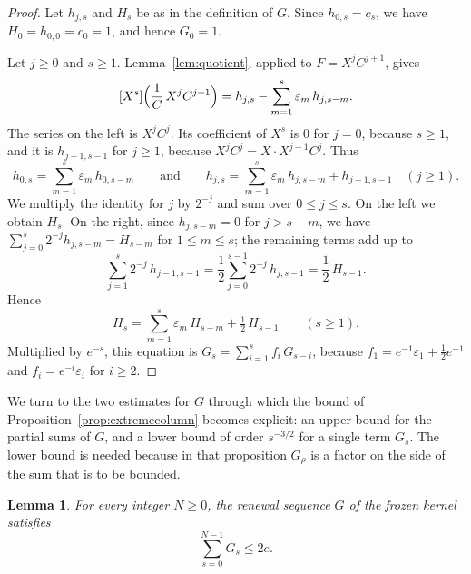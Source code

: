 \documentclass{amsart}
\newtheorem{lemma}[theorem]{Lemma}
\theoremstyle{definition}
\theoremstyle{remark}
\numberwithin{equation}{section}
\begin{document}
\begin{proof}
Let $h_{j,s}$ and $H_s$ be as in the definition of $G$. Since $h_{0,s}=c_s$, we have $H_0=h_{0,0}=c_0=1$, and hence $G_0=1$.

Let $j\ge 0$ and $s\ge 1$. Lemma~\ref{lem:quotient}, applied to $F=X^jC^{j+1}$, gives
\[
[X^s]\Bigl(\frac{1}{C}\,X^jC^{j+1}\Bigr)=h_{j,s}-\sum_{m=1}^{s}\varepsilon_m\,h_{j,s-m} .
\]
The series on the left is $X^jC^{j}$. Its coefficient of $X^s$ is $0$ for $j=0$, because $s\ge 1$, and it is $h_{j-1,s-1}$ for $j\ge 1$, because $X^jC^{j}=X\cdot X^{j-1}C^{j}$. Thus
\[
h_{0,s}=\sum_{m=1}^{s}\varepsilon_m\,h_{0,s-m}\qquad\text{and}\qquad h_{j,s}=\sum_{m=1}^{s}\varepsilon_m\,h_{j,s-m}+h_{j-1,s-1}\quad(j\ge 1).
\]
We multiply the identity for $j$ by $2^{-j}$ and sum over $0\le j\le s$. On the left we obtain $H_s$. On the right, since $h_{j,s-m}=0$ for $j>s-m$, we have $\sum_{j=0}^{s}2^{-j}h_{j,s-m}=H_{s-m}$ for $1\le m\le s$; the remaining terms add up to
\[
\sum_{j=1}^{s}2^{-j}\,h_{j-1,s-1}=\frac12\sum_{j=0}^{s-1}2^{-j}\,h_{j,s-1}=\frac12\,H_{s-1} .
\]
Hence
\[
H_s=\sum_{m=1}^{s}\varepsilon_m\,H_{s-m}+\tfrac12\,H_{s-1}\qquad(s\ge 1).
\]
Multiplied by $e^{-s}$, this equation is $G_s=\sum_{i=1}^{s}f_i\,G_{s-i}$, because $f_1=e^{-1}\varepsilon_1+\frac12e^{-1}$ and $f_i=e^{-i}\varepsilon_i$ for $i\ge 2$.
\end{proof}

We turn to the two estimates for $G$ through which the bound of Proposition~\ref{prop:extremecolumn} becomes explicit: an upper bound for the partial sums of $G$, and a lower bound of order $s^{-3/2}$ for a single term $G_s$. The lower bound is needed because in that proposition $G_\rho$ is a factor on the side of the sum that is to be bounded.

\begin{lemma}\label{lem:frozenmass}
For every integer $N\ge 0$, the renewal sequence $G$ of the frozen kernel satisfies
\[
\sum_{s=0}^{N-1}G_s\le 2e .
\]
\end{lemma}
\end{document}
